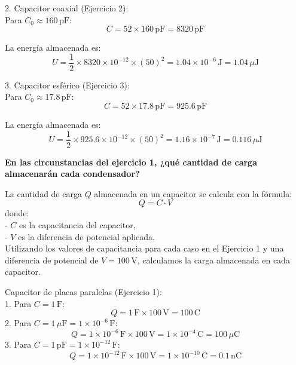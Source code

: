 \documentclass[answers]{exam} %
\begin{document}
\begin{questions}
        2. Capacitor coaxial (Ejercicio 2):\\
        Para \( C_0 \approx 160 \, \text{pF} \):
        \[
        C = 52 \times 160 \, \text{pF} = 8320 \, \text{pF}
        \]
        
        La energía almacenada es:
        \[
        U = \frac{1}{2} \times 8320 \times 10^{-12} \times (50)^2 = 1.04 \times 10^{-6} \, \text{J} = 1.04 \, \mu \text{J}
        \]
        
        3. Capacitor esférico (Ejercicio 3):\\
        Para \( C_0 \approx 17.8 \, \text{pF} \):
        \[
        C = 52 \times 17.8 \, \text{pF} = 925.6 \, \text{pF}
        \]
        
        La energía almacenada es:
        \[
        U = \frac{1}{2} \times 925.6 \times 10^{-12} \times (50)^2 = 1.16 \times 10^{-7} \, \text{J} = 0.116 \, \mu \text{J}
        \]
        
   
       
        
     \vspace{0.5cm}
    \question \large\textbf{En las circunstancias del ejercicio 1, ¿qué cantidad de carga almacenarán cada condensador?}
   
        La cantidad de carga \( Q \) almacenada en un capacitor se calcula con la fórmula:
        \[
        Q = C \cdot V
        \]
        donde:\\
        - \( C \) es la capacitancia del capacitor,\\
        - \( V \) es la diferencia de potencial aplicada.\\
        
        Utilizando los valores de capacitancia para cada caso en el Ejercicio 1 y una diferencia de potencial de \( V = 100 \, \text{V} \), calculamos la carga almacenada en cada capacitor.
        
        Capacitor de placas paralelas (Ejercicio 1):\\
        1. Para \( C = 1 \, \text{F} \):
           \[
           Q = 1 \, \text{F} \times 100 \, \text{V} = 100 \, \text{C}
           \]
        2. Para \( C = 1 \, \mu \text{F} = 1 \times 10^{-6} \, \text{F} \):
           \[
           Q = 1 \times 10^{-6} \, \text{F} \times 100 \, \text{V} = 1 \times 10^{-4} \, \text{C} = 100 \, \mu \text{C}
           \]
        3. Para \( C = 1 \, \text{pF} = 1 \times 10^{-12} \, \text{F} \):
           \[
           Q = 1 \times 10^{-12} \, \text{F} \times 100 \, \text{V} = 1 \times 10^{-10} \, \text{C} = 0.1 \, \text{nC}
           \]
        

\end{questions}
\end{document}
